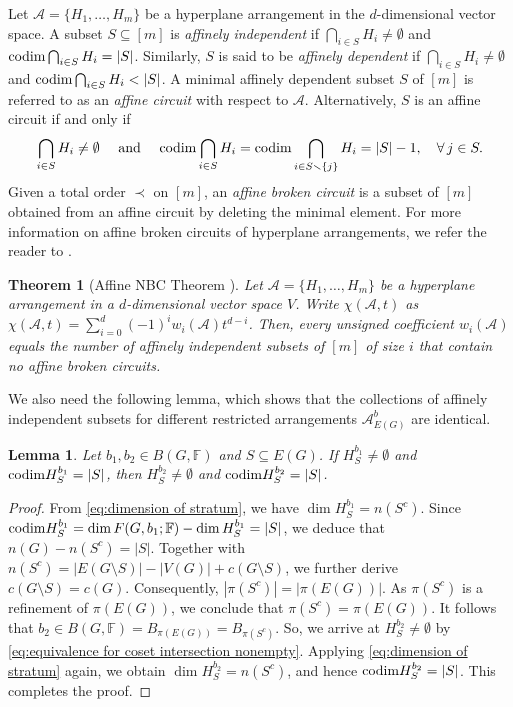 \documentclass[12pt]{article}%
\renewcommand*{\bm}[1]{#1}%
\numberwithin{equation}{section}
\def\And{\mbox{\rm ~and~}}
\newtheorem{theorem}{Theorem}[section]
\newtheorem{lemma}[lemma]{Lemma}
\begin{document}
Let $\mathcal{A}=\{H_1,\ldots,H_m\}$ be a hyperplane arrangement in the $d$-dimensional vector space. A subset $S\subseteq[m]$ is {\em affinely independent} if  $\bigcap_{i\in S}H_i\ne\emptyset$ and ${\rm codim} \bigcap_{i\in S}H_i=|S|$. Similarly, $S$ is said to be {\em affinely dependent} if $\bigcap_{i\in S}H_i\ne\emptyset$ and ${\rm codim} \bigcap_{i\in S}H_i<|S|$. A minimal affinely dependent subset $S$ of $[m]$ is referred to as an {\em affine circuit} with respect to $\mathcal{A}$. Alternatively, $S$ is an affine circuit if and only if
\[
\bigcap_{i\in S}H_i\ne\emptyset\quad\And\quad {\rm codim} \bigcap_{i\in S}H_i={\rm codim} \bigcap_{i\in S\smallsetminus\{j\}}H_i=|S|-1,\quad\forall\, j\in S.
\]
Given a total order $\prec$ on $[m]$, an {\em affine broken circuit} is a subset of $[m]$ obtained from an affine circuit by deleting  the minimal element. For more information on affine broken circuits of hyperplane arrangements, we refer the reader to \cite{Forge-Zaslavsky2016,Orlik-Terao1992}.
\begin{theorem}[Affine NBC Theorem \cite{Orlik-Terao1992}]\label{affine-NBC} Let $\mathcal{A}=\{H_1,\ldots, H_m\}$ be a hyperplane arrangement in a $d$-dimensional vector space $V$. Write $\chi(\mathcal{A},t)$ as $\chi(\mathcal{A},t)=\sum_{i=0}^d(-1)^iw_i(\mathcal{A})t^{d-i}$. Then, every unsigned coefficient $w_i(\mathcal{A})$ equals the number of  affinely independent subsets of $[m]$ of size $i$ that contain no affine broken circuits.
\end{theorem}

We also need the following lemma, which shows that the collections of affinely independent subsets for different restricted arrangements $\mathcal{A}_{E(G)}^{\bm b}$ are identical.
\begin{lemma}\label{Independent}
Let $\bm b_1,\bm b_2\in B(G,\mathbb{F})$ and $S\subseteq E(G)$. If $H_S^{\bm b_1}\ne\emptyset$ and ${\rm codim}H_S^{\bm b_1}=|S|$, then $H_S^{\bm b_2}\ne\emptyset$ and ${\rm codim}H_S^{\bm b_2}=|S|$.
\end{lemma}
\begin{proof}
From \eqref{eq:dimension of stratum}, we have $\dim H_S^{\bm b_1}=n(S^c)$. Since ${\rm codim}H_S^{\bm b_1}=\dim F(G,\bm b_1;\mathbb{F})-\dim H_S^{\bm b_1}=|S|$, we deduce that $n(G)-n(S^c)=|S|$. Together with $n(S^c)=|E(G\setminus S)|-|V(G)|+c(G\setminus S)$, we further derive $c(G\setminus S)=c(G)$. Consequently, $|\pi(S^c)|=|\pi(E(G))|$. As $\pi(S^c)$ is a refinement of $\pi(E(G))$, we conclude that $\pi(S^c)=\pi(E(G))$. It follows that $\bm b_2\in B(G,\mathbb{F})=B_{\pi(E(G))}=B_{\pi(S^c)}$. So, we arrive at $H_S^{\bm b_2}\ne\emptyset$ by \eqref{eq:equivalence for coset intersection nonempty}. Applying \eqref{eq:dimension of stratum} again, we obtain $\dim H_S^{\bm b_2}=n(S^c)$, and hence ${\rm codim}H_S^{\bm b_2}=|S|$. This completes the proof.
\end{proof}
\end{document}
